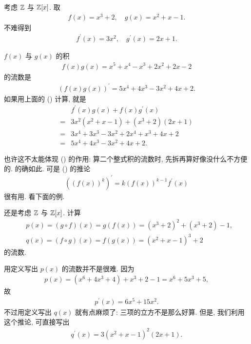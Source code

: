 \begin{example}
    考虑 $\mathbb{Z}$ 与 $\mathbb{Z}[x]$. 取
    \begin{align*}
        f(x) = x^3 + 2, \quad g(x) = x^2 + x - 1.
    \end{align*}
    不难得到
    \begin{align*}
        f^{\prime} (x) = 3x^2, \quad g^{\prime} (x) = 2x + 1.
    \end{align*}

    $f(x)$ 与 $g(x)$ 的积
    \begin{align*}
        f(x) g(x) = x^5 + x^4 - x^3 + 2x^2 + 2x - 2
    \end{align*}
    的流数是
    \begin{align*}
        (f(x) g(x))^{\prime} = 5x^4 + 4x^3 - 3x^2 + 4x + 2.
    \end{align*}
    如果用上面的 (\myStar) 计算, 就是
    \begin{align*}
             & f^{\prime} (x) g(x) + f(x) g^{\prime} (x) \\
        = {} & 3x^2 (x^2 + x - 1) + (x^3 + 2) (2x + 1)   \\
        = {} & 3x^4 + 3x^3 - 3x^2 + 2x^4 + x^3 + 4x + 2  \\
        = {} & 5x^4 + 4x^3 - 3x^2 + 4x + 2.
    \end{align*}
\end{example}

也许这不太能体现 (\myStar) 的作用: 算二个整式积的流数时, 先拆再算好像没什么不方便的. 的确如此. 可是 (\myStar) 的推论
\begin{align*}
    ((f(x))^k)^{\prime} = k(f(x))^{k-1} f^{\prime}(x)
\end{align*}
很有用. 看下面的例.

\begin{example}
    还是考虑 $\mathbb{Z}$ 与 $\mathbb{Z}[x]$. 计算
    \begin{align*}
         & p(x) = (g \circ f) (x) = g(f(x)) = (x^3 + 2)^2 + (x^3 + 2) - 1, \\
         & q(x) = (f \circ g) (x) = f(g(x)) = (x^2 + x - 1)^3 + 2
    \end{align*}
    的流数.

    用定义写出 $p(x)$ 的流数并不是很难. 因为
    \begin{align*}
        p(x) = (x^6 + 4x^3 + 4) + x^3 + 2 - 1 = x^6 + 5x^3 + 5,
    \end{align*}
    故
    \begin{align*}
        p^{\prime} (x) = 6x^5 + 15x^2.
    \end{align*}
    不过用定义写出 $q(x)$ 就有点麻烦了: 三项的立方不是那么好算. 但是, 我们利用这个推论, 可直接写出
    \begin{align*}
        q^{\prime} (x) = 3(x^2 + x - 1)^2 (2x + 1).
    \end{align*}
\end{example}

